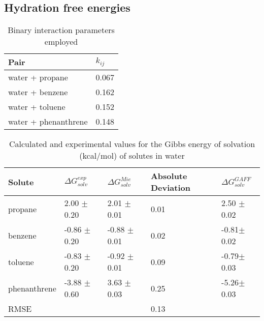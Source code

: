 \subsection{Hydration free energies}


\begin{table}[h]
\center
  \caption{Binary interaction parameters employed}
  \label{tbl:kij}
  \begin{tabular}{ll}
    \hline
      Pair & $k_{ij}$ \\
    \hline
    water  + propane      & 0.067  \\
    water  + benzene      & 0.162 \\  
    water  + toluene      & 0.152 \\
    water  + phenanthrene & 0.148  \\
    \hline
  \end{tabular}

\end{table}

\begin{table*}[h]
\center
  \caption{Calculated and experimental values for the Gibbs energy of solvation (kcal/mol) of solutes in water}
  \label{tbl:solv2}
  \begin{tabular}{lllll}
    \hline
     Solute      & $\Delta G_{solv}^{exp}$ & $\Delta G_{solv}^{Mie}$ & Absolute Deviation &$\Delta G_{solv}^{GAFF}$ \\
    \hline
    propane      &  2.00 $\pm$ 0.20 & 2.01 $\pm$ 0.01& 0.01 &2.50 $\pm$0.02 \\
    benzene      & -0.86 $\pm$ 0.20 & -0.88 $\pm$ 0.01    &  0.02    &-0.81$\pm$0.02 \\  
    toluene      & -0.83 $\pm$ 0.20 & -0.92 $\pm$ 0.01   &  0.09    &-0.79$\pm$0.03\\
    phenanthrene & -3.88 $\pm$ 0.60 & 3.63 $\pm$ 0.03& 0.25 &-5.26$\pm$0.03 \\
    \hline
    RMSE         &                  &               &  0.13     &      \\
    \hline
  \end{tabular}

\end{table*}
